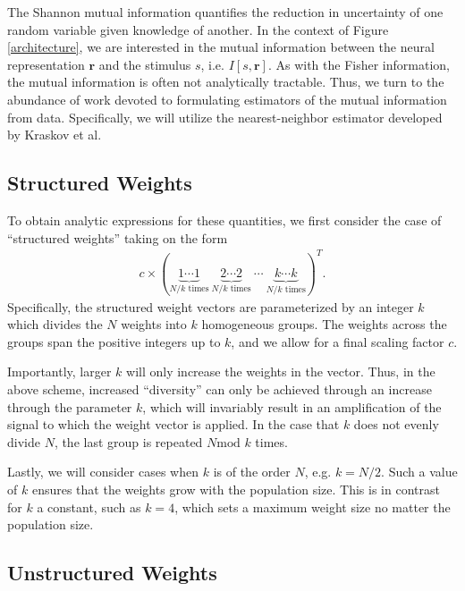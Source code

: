\documentclass[11pt]{article}
\begin{document}
	The Shannon mutual information quantifies the reduction in uncertainty of one random variable given knowledge of another. In the context of Figure \ref{architecture}, we are interested in the mutual information between the neural representation $\mathbf{r}$ and the stimulus $s$, i.e. $I[s, \mathbf{r}]$. As with the Fisher information, the mutual information is often not analytically tractable. Thus, we turn to the abundance of work devoted to formulating estimators of the mutual information from data. Specifically, we will utilize the nearest-neighbor estimator developed by Kraskov et al. 
	\subsection{Structured Weights}
	To obtain analytic expressions for these quantities, we first consider the case of ``structured weights'' taking on the form
	\begin{align}
		c \times \left(\underbrace{1 \cdots 1}_{N/k \text{ times}}  \ \underbrace{2 \cdots 2}_{N/k \text{ times}} \ \cdots \ \underbrace{k \cdots k}_{N/k \text{ times}}   \right)^T.
	\end{align}
	Specifically, the structured weight vectors are parameterized by an integer $k$ which divides the $N$ weights into $k$ homogeneous groups. The weights across the groups span the positive integers up to $k$, and we allow for a final scaling factor $c$. 
	
	Importantly,  larger $k$ will only increase the weights in the vector. Thus, in the above scheme, increased ``diversity'' can only be achieved through an increase through the parameter $k$, which will invariably result in an amplification of the signal to which the weight vector is applied. In the case that $k$ does not evenly divide $N$, the last group is repeated $N\text{mod }k$ times.
	
	Lastly, we will consider cases when $k$ is of the order $N$, e.g. $k = N/2$. Such a value of $k$ ensures that the weights grow with the population size. This is in contrast for $k$ a constant, such as $k=4$, which sets a maximum weight size no matter the population size. 
	\subsection{Unstructured Weights}
	
\end{document}

